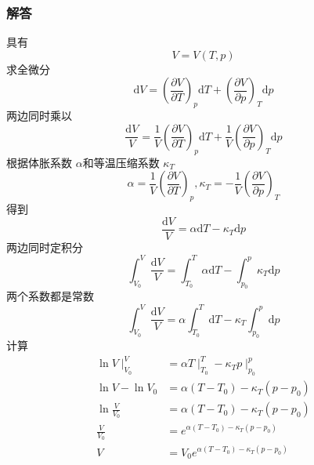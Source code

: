 \subsubsection{解答}
具有
\begin{equation}
    V=V\left( T,p \right) 
\end{equation}
求全微分
\begin{equation}
    \mathrm{d}V=\left( \frac{\partial V}{\partial T} \right) _p\mathrm{d}T+\left( \frac{\partial V}{\partial p} \right) _T\mathrm{d}p
\end{equation}
两边同时乘以
\begin{equation}
    \frac{\mathrm{d}V}{V}=\frac{1}{V}\left( \frac{\partial V}{\partial T} \right) _p\mathrm{d}T+\frac{1}{V}\left( \frac{\partial V}{\partial p} \right) _T\mathrm{d}p
\end{equation}
根据体胀系数 $\alpha$和等温压缩系数 $\kappa_T$
\begin{equation}
    \alpha =\frac{1}{V}\left( \frac{\partial V}{\partial T} \right) _p,\kappa _T=-\frac{1}{V}\left( \frac{\partial V}{\partial p} \right) _T
\end{equation}
得到
\begin{equation}
    \frac{\mathrm{d}V}{V}=\alpha \mathrm{d}T-\kappa _T\mathrm{d}p
\end{equation}
两边同时定积分
\begin{equation}
    \int_{V_0}^V{\frac{\mathrm{d}V}{V}}=\int_{T_0}^T{\alpha \mathrm{d}T}-\int_{p_0}^p{\kappa _T\mathrm{d}p}
\end{equation}
两个系数都是常数
\begin{equation}
    \int_{V_0}^V{\frac{\mathrm{d}V}{V}}=\alpha \int_{T_0}^T{\mathrm{d}T}-\kappa _T\int_{p_0}^p{\mathrm{d}p}
\end{equation}
计算
\begin{equation}
    \begin{aligned}
        \ln V\mid_{V_0}^{V}&=\alpha T\mid_{T_0}^{T}-\kappa _Tp\mid_{p_0}^{p}
\\
\ln V-\ln V_0&=\alpha \left( T-T_0 \right) -\kappa _T\left( p-p_0 \right) 
\\
\ln \frac{V}{V_0}&=\alpha \left( T-T_0 \right) -\kappa _T\left( p-p_0 \right) 
\\
\frac{V}{V_0}&=e^{\alpha \left( T-T_0 \right) -\kappa _T\left( p-p_0 \right)}
\\
V&=V_0e^{\alpha \left( T-T_0 \right) -\kappa _T\left( p-p_0 \right)}
    \end{aligned}
\end{equation}
